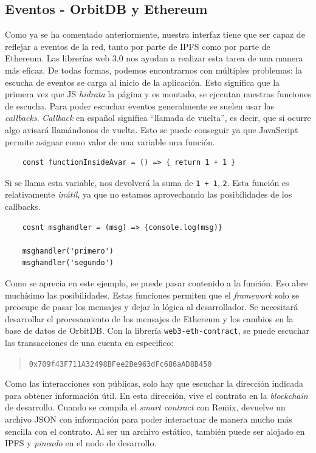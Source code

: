 \subsection{Eventos - OrbitDB y Ethereum}
Como ya se ha comentado anteriormente, nuestra interfaz tiene que ser capaz de reflejar a eventos de la red, tanto por parte de IPFS como por parte de Ethereum.
Las librerías web 3.0 nos ayudan a realizar esta tarea de una manera más eficaz. De todas formas, podemos encontrarnos con múltiples problemas:
la escucha de eventos se carga al inicio de la aplicación. Esto significa que la primera vez que JS \textit{hidrata} la página y es montado, se ejecutan nuestras funciones de escucha.
Para poder escuchar eventos generalmente se suelen usar las \textit{callbacks}. \textit{Callback} en español significa “llamada de vuelta”, es decir, que si ocurre algo avisará llamándonos de vuelta.
Esto se puede conseguir ya que JavaScript permite asignar como valor de una variable una función.
\begin{lstlisting}
    const functionInsideAvar = () => { return 1 + 1 }
\end{lstlisting}
Si se llama esta variable, nos devolverá la suma de \verb|1 + 1|, \verb|2|.
Esta función es relativamente \textit{inútil}, ya que no estamos aprovechando las posibilidades de los callbacks.
\begin{lstlisting}
    cosnt msghandler = (msg) => {console.log(msg)}

    msghandler('primero')
    msghandler('segundo')
\end{lstlisting}
Como se aprecia en este ejemplo, se puede pasar contenido a la función. Eso abre muchísimo las posibilidades. Estas funciones permiten que el \textit{framework} solo se preocupe de pasar los mensajes y dejar la lógica al desarrollador. Se necesitará desarrollar el procesamiento de los mensajes de Ethereum y los cambios en la base de datos de OrbitDB.
Con la librería \verb|web3-eth-contract|, se puede escuchar las transacciones de una cuenta en especifico:
\begin{quote}
    \verb|0x709f43F711A32498BFee2Be963dFc686aAD8B450|
\end{quote}
Como las interacciones son públicas, solo hay que escuchar la dirección indicada para obtener información útil. En esta dirección, vive el contrato en la \textit{blockchain} de desarrollo.
Cuando se compila el \textit{smart contract} con Remix, devuelve un archivo JSON con información para poder interactuar de manera mucho más sencilla con el contrato.
Al ser un archivo estático, también puede ser alojado en IPFS y \textit{pineado} en el nodo de desarrollo.
